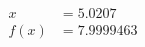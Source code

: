 \documentclass[preview]{standalone}
\begin{document}
\begin{align*}
x &= 5.0207\\f(x) &= 7.9999463
\end{align*}
\end{document}
